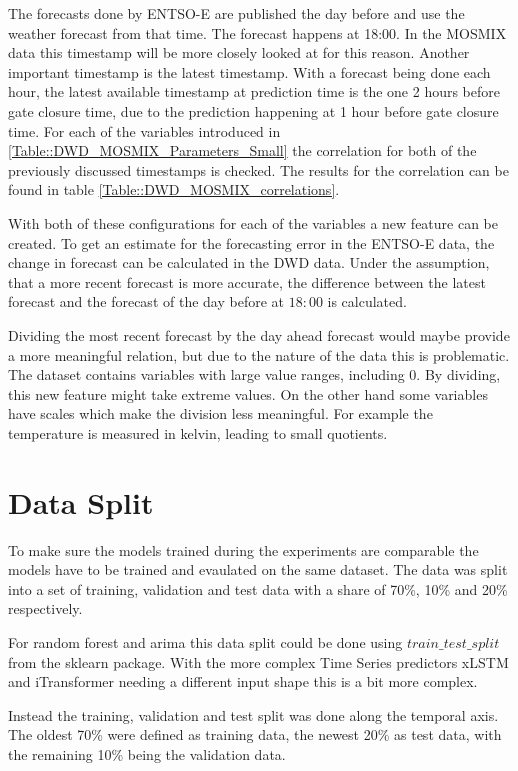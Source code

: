 \documentclass[class=scrbook, crop=false]{standalone}
\begin{document}
    The forecasts done by ENTSO-E are published the day before and use the weather forecast from that time.
    The forecast happens at 18:00. 
    In the MOSMIX data this timestamp will be more closely looked at for this reason.
    Another important timestamp is the latest timestamp. 
    With a forecast being done each hour, the latest available timestamp at prediction time is the one 2 hours before gate closure time, due to the prediction happening at 1 hour before gate closure time.
    For each of the variables introduced in \ref{Table::DWD_MOSMIX_Parameters_Small} the correlation for both of the previously discussed timestamps is checked.
    The results for the correlation can be found in table \ref{Table::DWD_MOSMIX_correlations}. 
    
    With both of these configurations for each of the variables a new feature can be created. 
    To get an estimate for the forecasting error in the ENTSO-E data, the change in forecast can be calculated in the DWD data.
    Under the assumption, that a more recent forecast is more accurate, the difference between the latest forecast and the forecast of the day before at $18:00$ is calculated. 
    
    Dividing the most recent forecast by the day ahead forecast would maybe provide a more meaningful relation, but due to the nature of the data this is problematic.
    The dataset contains variables with large value ranges, including 0. 
    By dividing, this new feature might take extreme values.
    On the other hand some variables have scales which make the division less meaningful.
    For example the temperature is measured in kelvin, leading to small quotients.

\section{Data Split}
\label{Section::Data_Split}

To make sure the models trained during the experiments are comparable the models have to be trained and evaulated on the same dataset.
The data was split into a set of training, validation and test data with a share of 70\%, 10\% and 20\% respectively.

For random forest and arima this data split could be done using $train\_test\_split$ from the sklearn package. 
With the more complex Time Series predictors xLSTM and iTransformer needing a different input shape this is a bit more complex.

Instead the training, validation and test split was done along the temporal axis. 
The oldest 70\% were defined as training data, the newest 20\% as test data, with the remaining 10\% being the validation data.
\end{document}
